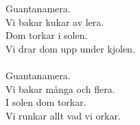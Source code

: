 
            Guantanamera. \\
            Vi bakar kukar av lera. \\
            Dom torkar i solen. \\
            Vi drar dom upp under kjolen. \\
\hspace{10mm} \\
            Guantanamera. \\
            Vi bakar många och flera. \\
            I solen dom torkar. \\
            Vi runkar allt vad vi orkar. \\
